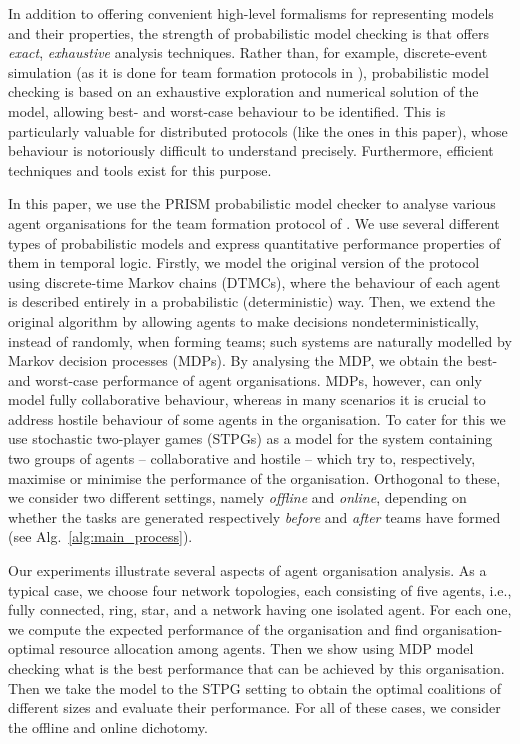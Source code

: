 \documentclass{llncs}
\newcommand{\dave}[1]{\marginpar{\footnotesize \color{red} {\bf D:} \textsf{#1}}}
\begin{document}
In addition to offering convenient high-level formalisms for representing models and their properties,
the strength of probabilistic model checking is that offers \emph{exact}, \emph{exhaustive} analysis techniques.
Rather than, for example, discrete-event simulation
(as it is done for team formation protocols in \cite{gaston2005agent}),
probabilistic model checking is based on an exhaustive exploration and numerical solution of the model,
allowing best- and worst-case behaviour to be identified.
This is particularly valuable for distributed protocols (like the ones in this paper),
whose behaviour is notoriously difficult to understand precisely. %
Furthermore, efficient techniques and tools exist for this purpose.

In this paper, we use the PRISM probabilistic model checker \cite{KNP11} to analyse various agent organisations for the team formation protocol of \cite{gaston2005agent}.
We use several different types of probabilistic models
and express quantitative performance properties of them in temporal logic.
Firstly, we model the original version of the protocol using discrete-time Markov chains (DTMCs), where the behaviour of each agent is described entirely in a probabilistic (deterministic) way. Then, we extend the original algorithm  by allowing agents to make decisions nondeterministically, instead of randomly, when forming teams; such systems are naturally modelled by Markov decision processes (MDPs). By analysing the MDP, we obtain the best- and worst-case performance of agent organisations.
MDPs, however, can only model fully collaborative behaviour, whereas in many scenarios it is crucial to address hostile behaviour of some agents in the organisation. To cater for this we use stochastic two-player games (STPGs) as a model for the system containing two groups of agents -- collaborative and hostile -- which try to, respectively, maximise or minimise the performance of the organisation. Orthogonal to these, we consider two different settings, namely \emph{offline} and \emph{online}, depending on whether the tasks are generated respectively \emph{before} and \emph{after} teams have formed (see Alg.~\ref{alg:main_process}).


Our experiments illustrate several aspects of agent organisation analysis. As a typical case, we choose four network topologies, each consisting of five agents, i.e., fully connected, ring, star, and a network having one isolated agent. For each one, we compute the expected performance of the organisation and find organisation-optimal resource allocation among agents. Then we show using MDP model checking what is the best performance that can be achieved by this organisation. Then we take the model to the STPG setting to obtain the optimal coalitions of different sizes and evaluate their performance. For all of these cases, we consider the offline and online dichotomy.
\end{document}
